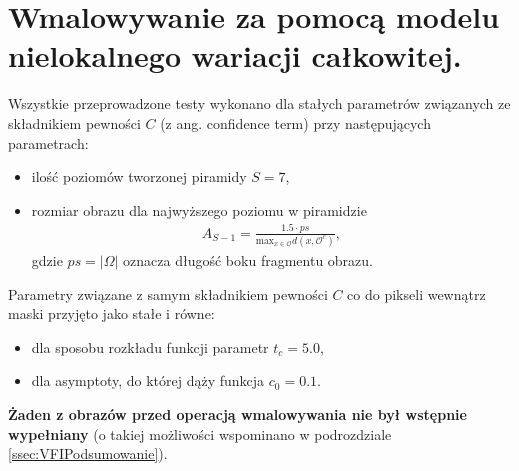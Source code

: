 \documentclass[12pt, twoside, openany]{report}
\theoremstyle{definition}
\begin{document}
\section{Wmalowywanie za pomocą modelu nielokalnego wariacji całkowitej.}
Wszystkie przeprowadzone testy wykonano dla stałych parametrów związanych ze składnikiem pewności $C$ (z ang. confidence term) przy następujących parametrach:
\begin{itemize}
\item
ilość poziomów tworzonej piramidy $S=7$,
\item
rozmiar obrazu dla najwyższego poziomu w piramidzie 
\begin{align}
A_{S-1}=\frac{1.5 \cdot ps}{\mathrm{max}_{x \in \mathcal{O}}d(x,\mathcal{O}^{c})}
,
\end{align}
gdzie $ps = |\Omega|$ oznacza długość boku fragmentu obrazu.
\end{itemize}
Parametry związane z samym składnikiem pewności $C$ co do pikseli wewnątrz maski przyjęto jako stałe i równe:
\begin{itemize}
\item
dla sposobu rozkładu funkcji parametr $t_{c}=5.0$,
\item 
dla asymptoty, do której dąży funkcja $c_{0}=0.1$.
\end{itemize}
\textbf{Żaden z obrazów przed operacją wmalowywania nie był wstępnie wypełniany} (o takiej możliwości wspominano w podrozdziale \ref{ssec:VFIPodsumowanie}).
\end{document}
